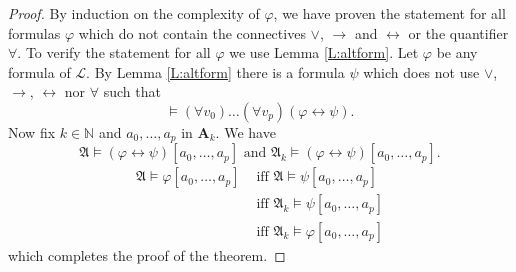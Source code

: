\documentclass[titlepage, oneside]{amsbook}
\theoremstyle{plain}
\theoremstyle{definition}
\theoremstyle{remark}
\newcommand{\lan}{\ensuremath{\mathcal{L}}}
\newcommand{\ma}{\ensuremath{\mathfrak{A}}}
\newcommand{\ba}{\ensuremath{\mathbf{A}}}
\newcommand{\nat}{\ensuremath{\mathbb{N}}}
\newcommand{\anot}[2][0]{\ensuremath{ a_{#1} , \dots , a_{#2}}}
\newcommand{\vp}{\ensuremath{\varphi}}
\newcommand{\lra}{\ensuremath{\leftrightarrow}}
\begin{document}
\begin{proof}
By induction on the complexity of $\vp$, we have proven the statement
for all formulas $\vp$ which do not contain the connectives $\vee $,
$\to$ and $\lra$ or the quantifier $\forall$.  To verify the statement
for all $\vp$ we use Lemma \ref{L:altform}.    Let $\vp$ be any formula
of $\lan$.  By Lemma \ref{L:altform}  there is a formula $\psi$ which
does not use $\vee$, $\to$, $\lra$ nor $\forall$ such that \[ \models
(\forall v_0 ) \dots (\forall v_p ) (\vp \lra \psi ) . \]
Now fix $k \in \nat$ and $\anot p$ in $\ba_k$.  We have 
\[ \ma \models (\vp  \lra \psi ) [ \anot p ] \mbox{ and } \ma_k \models
(\vp  \lra \psi ) [ \anot p ]. \]
\[\begin{aligned}  \ma \models \varphi [ \anot p ]  &\mbox{ iff } \ma
\models \psi [ \anot p ] \\
&\mbox{ iff }  \ma_k  \models \psi [ \anot p ] \\
&\mbox{ iff } \ma_k \models \vp [ \anot p ] \end{aligned} \]
which completes the proof of the theorem.


\end{proof}
\end{document}
